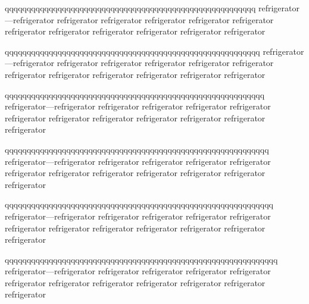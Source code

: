\documentclass{article}
\begin{document}
\noindent qqqqqqqqqqqqqqqqqqqqqqqqqqqqqqqqqqqqqqqqqqqqqqqqqqqqqqqqq refrigerator---refrigerator refrigerator refrigerator refrigerator refrigerator refrigerator refrigerator refrigerator refrigerator refrigerator refrigerator refrigerator

\noindent qqqqqqqqqqqqqqqqqqqqqqqqqqqqqqqqqqqqqqqqqqqqqqqqqqqqqqqqqq refrigerator---refrigerator refrigerator refrigerator refrigerator refrigerator refrigerator refrigerator refrigerator refrigerator refrigerator refrigerator refrigerator

\noindent qqqqqqqqqqqqqqqqqqqqqqqqqqqqqqqqqqqqqqqqqqqqqqqqqqqqqqqqqqq refrigerator---refrigerator refrigerator refrigerator refrigerator refrigerator refrigerator refrigerator refrigerator refrigerator refrigerator refrigerator refrigerator

\noindent qqqqqqqqqqqqqqqqqqqqqqqqqqqqqqqqqqqqqqqqqqqqqqqqqqqqqqqqqqqq refrigerator---refrigerator refrigerator refrigerator refrigerator refrigerator refrigerator refrigerator refrigerator refrigerator refrigerator refrigerator refrigerator

\noindent qqqqqqqqqqqqqqqqqqqqqqqqqqqqqqqqqqqqqqqqqqqqqqqqqqqqqqqqqqqqq refrigerator---refrigerator refrigerator refrigerator refrigerator refrigerator refrigerator refrigerator refrigerator refrigerator refrigerator refrigerator refrigerator

\noindent qqqqqqqqqqqqqqqqqqqqqqqqqqqqqqqqqqqqqqqqqqqqqqqqqqqqqqqqqqqqqq refrigerator---refrigerator refrigerator refrigerator refrigerator refrigerator refrigerator refrigerator refrigerator refrigerator refrigerator refrigerator refrigerator
\end{document}
